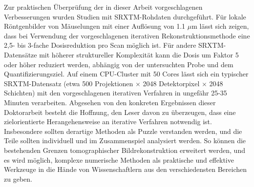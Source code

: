 {Zur praktischen \"{U}berpr\"{u}fung der in dieser Arbeit vorgeschlagenen Verbesserungen wurden Studien mit SRXTM-Rohdaten durchgef\"{u}hrt. 
F\"{u}r lokale R\"{o}ntgenbilder von M\"{a}uselungen mit einer 
Aufl\"{o}sung von 1.1 $\mu$m 
l\"{a}sst sich zeigen, dass bei Verwendung der vorgeschlagenen
iterativen Rekonstruktionsmethode eine 2,5- bis 3-fache Dosisreduktion pro Scan m\"{o}glich ist. F\"{u}r andere SRXTM-Datens\"{a}tze
mit h\"{o}herer struktureller Komplexit\"{a}t kann die Dosis um Faktor 5 oder h\"{o}her reduziert werden, abh\"{a}ngig von der untersuchten
Probe und dem Quantifizierungsziel. Auf einem CPU-Cluster mit 50 Cores l\"{a}sst sich ein typischer SRXTM-Datensatz
(etwa 500 Projektionen $\times$ 2048 Detektorpixel $\times$ 2048 Schichten) mit den vorgeschlagenen iterativen Verfahren in ungef\"{a}hr 25-35 Minuten verarbeiten.
\newline\newline
Abgesehen von den konkreten Ergebnissen dieser Doktorarbeit besteht die Hoffnung, den Leser davon zu \"{u}berzeugen, 
dass eine zielorientierte Herangehensweise an iterative Verfahren notwendig ist. Insbesondere sollten derartige Methoden als 
Puzzle verstanden werden, und die Teile sollten individuell und im Zusammenspiel analysiert werden. So k\"{o}nnen die bestehenden
Grenzen tomographischer Bildrekonstruktion erweitert werden, und es wird m\"{o}glich, komplexe numerische Methoden als praktische
und effektive Werkzeuge in die H\"{a}nde von Wissenschaftlern aus den verschiedensten Bereichen zu geben.


}

